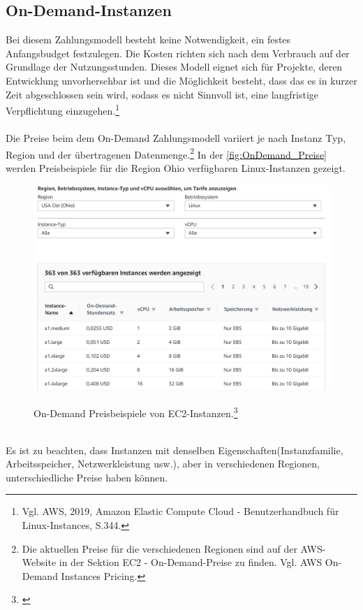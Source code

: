 \subsection{On-Demand-Instanzen}
Bei diesem Zahlungsmodell besteht keine Notwendigkeit, ein festes Anfangsbudget festzulegen. Die Kosten richten sich nach dem Verbrauch auf der Grundlage der Nutzungsstunden. Dieses Modell eignet sich für Projekte, deren Entwicklung unvorhersehbar ist und die Möglichkeit besteht, dass das es in kurzer Zeit abgeschlossen sein wird, sodass es nicht Sinnvoll ist, eine langfristige Verpflichtung einzugehen.\footnote{Vgl. AWS, 2019, Amazon Elastic Compute Cloud - Benutzerhandbuch für Linux-Instances, S.344\cite{AMZ26}.}
\\\\
Die Preise beim dem On-Demand Zahlungsmodell variiert je nach Instanz Typ, Region und der übertragenen Datenmenge.\footnote{Die aktuellen Preise für die verschiedenen Regionen sind auf der AWS-Website in der Sektion EC2 - On-Demand-Preise zu finden. Vgl. AWS On-Demand Instances Pricing.\cite{AMZ02}}  
In der \autoref{fig:OnDemand_Preise} werden Preisbeispiele für die Region Ohio verfügbaren Linux-Instanzen gezeigt.
\begin{figure}
    \centering
    \includegraphics[scale=0.5]{sources/On-Demand-Pläne für Amazon EC2}\label{fig:OnDemand_Preise}\\
    \caption[On-Demand Preise für Amazon EC2]{}
    \label{fig:OnDemand_Preise}  On-Demand Preisbeispiele von EC2-Instanzen.\footnote{\cite{AMZ02}}
  \end{figure}
\\
Es ist zu beachten, dass Instanzen mit denselben Eigenschaften(Instanzfamilie, Arbeitsspeicher, Netzwerkleistung usw.), aber in verschiedenen Regionen, unterschiedliche Preise haben können.
